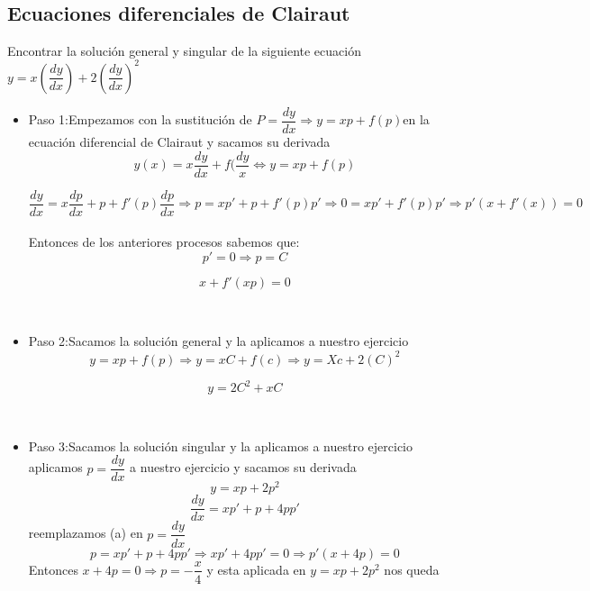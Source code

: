 \documentclass[10pt,a4paper]{article}
\begin{document}
{{{{{{{{{{{{\,\\
\subsection{Ecuaciones diferenciales de Clairaut}
Encontrar  la solución general y singular de la siguiente ecuación $y=x(\dfrac{dy}{dx})+2(\dfrac{dy}{dx})^2$ 
\begin{itemize}

\item Paso 1:Empezamos con la sustitución de $P=\dfrac{dy}{dx}\Rightarrow y=xp+f(p)$en la ecuación diferencial de Clairaut y sacamos su derivada
\begin{equation*}
y(x)=x\dfrac{dy}{dx}+f(\dfrac{dy}{x}\Leftrightarrow y= xp+f(p) 
\end{equation*}

\begin{equation*}
 \dfrac{dy}{dx}=x\dfrac{dp}{dx}+p+f'(p)\dfrac{dp}{dx}\Rightarrow p=xp'+p+f'(p)p'\Rightarrow 0=xp'+f'(p)p'\Rightarrow p'(x+f'(x))=0
\end{equation*}
\\
Entonces de los anteriores procesos sabemos que:
\begin{equation}\tag{1}
p'=0 \Rightarrow p=C 
\end{equation}

\begin{equation}\tag{2}
x+f'(xp)=0  
\end{equation}

\,\\
\item Paso 2:Sacamos la solución general y la aplicamos a nuestro ejercicio
\begin{equation*}
y=xp+f(p)\Rightarrow y=xC+f(c)\Rightarrow y=Xc+2(C) ^2
\end{equation*}

\begin{equation}\tag{solución general}
y=2C^2+xC
\end{equation}

\,\\
\item Paso 3:Sacamos la solución singular y la aplicamos a nuestro ejercicio\\
aplicamos $p=\dfrac{dy}{dx}$ a nuestro ejercicio y sacamos su derivada
\begin{equation*}
y=xp+2p ^2
\end{equation*}
\begin{equation}\tag{a}
\dfrac{dy}{dx}=xp'+p+4pp'
\end{equation}
reemplazamos (a) en $p=\dfrac{dy}{dx}$ 
\begin{equation*}
p=xp'+p+4pp'\Rightarrow xp'+4pp'=0\Rightarrow p'(x+4p)=0
\end{equation*}
Entonces $x+4p=0\Rightarrow p=-\dfrac{x}{4}$ y esta aplicada en $y=xp+2p ^2$ nos queda


\end{itemize}}}}}}}}}}}}}
\end{document}
